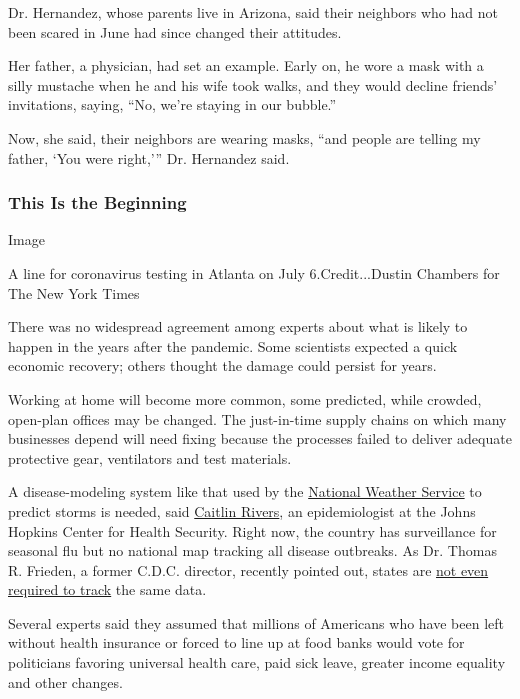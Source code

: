 Dr. Hernandez, whose parents live in Arizona, said their neighbors who
had not been scared in June had since changed their attitudes.

Her father, a physician, had set an example. Early on, he wore a mask
with a silly mustache when he and his wife took walks, and they would
decline friends' invitations, saying, ``No, we're staying in our
bubble.''

Now, she said, their neighbors are wearing masks, ``and people are
telling my father, `You were right,''' Dr. Hernandez said.

\hypertarget{this-is-the-beginning}{%
\subsubsection{This Is the Beginning}\label{this-is-the-beginning}}

Image

A line for coronavirus testing in Atlanta on July 6.Credit...Dustin
Chambers for The New York Times

There was no widespread agreement among experts about what is likely to
happen in the years after the pandemic. Some scientists expected a quick
economic recovery; others thought the damage could persist for years.

Working at home will become more common, some predicted, while crowded,
open-plan offices may be changed. The just-in-time supply chains on
which many businesses depend will need fixing because the processes
failed to deliver adequate protective gear, ventilators and test
materials.

A disease-modeling system like that used by the
\href{https://www.weather.gov/}{National Weather Service} to predict
storms is needed, said
\href{https://www.centerforhealthsecurity.org/our-people/rivers/}{Caitlin
Rivers}, an epidemiologist at the Johns Hopkins Center for Health
Security. Right now, the country has surveillance for seasonal flu but
no national map tracking all disease outbreaks. As Dr. Thomas R.
Frieden, a former C.D.C. director, recently pointed out, states are
\href{https://www.nytimes3xbfgragh.onion/2020/07/21/health/coronavirus-data-states-cdc.html}{not
even required to track} the same data.

Several experts said they assumed that millions of Americans who have
been left without health insurance or forced to line up at food banks
would vote for politicians favoring universal health care, paid sick
leave, greater income equality and other changes.

